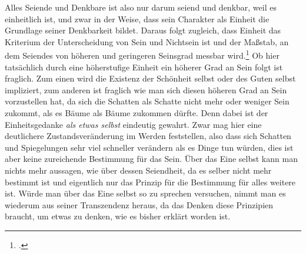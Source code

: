 Alles Seiende und Denkbare ist also nur darum seiend und denkbar, weil es einheitlich ist, und zwar in der Weise, dass sein Charakter als Einheit die Grundlage seiner Denkbarkeit bildet. Daraus folgt zugleich, dass Einheit das Kriterium der Unterscheidung von Sein und Nichtsein ist und der Maßstab, an dem Seiendes von höheren und geringeren Seinsgrad messbar wird.\footcite[vgl.][S. 99]{halfwassen2015spuren}
Ob hier tatsächlich durch eine höherstufige Einheit ein höherer Grad an Sein folgt ist fraglich. Zum einen wird die Existenz der Schönheit selbst oder des Guten selbst impliziert, zum anderen ist fraglich wie man sich diesen höheren Grad an Sein vorzustellen hat, da sich die Schatten als Schatte nicht mehr oder weniger Sein zukommt, als es Bäume als Bäume zukommen dürfte. Denn dabei ist der Einheitsgedanke \emph{als etwas selbst} eindeutig gewahrt. Zwar mag hier eine deutlichere Zustandsveränderung im Werden feststellen, also dass sich Schatten und Spiegelungen sehr viel schneller verändern als es Dinge tun würden, dies ist aber keine zureichende Bestimmung für das Sein. 
Über das Eine selbst kann man nichts mehr aussagen, wie über dessen Seiendheit, da es selber nicht mehr bestimmt ist und eigentlich nur das Prinzip für die Bestimmung für alles weitere ist. Würde man über das Eine selbst so zu sprechen versuchen, nimmt man es wiederum aus seiner Transzendenz heraus, da das Denken diese Prinzipien braucht, um etwas zu denken, wie es bisher erklärt worden ist.
